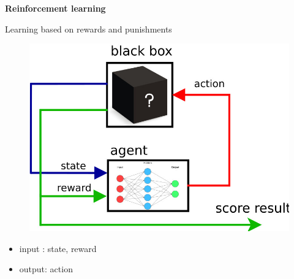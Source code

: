 \documentclass[xcolor=dvipsnames]{beamer}
\begin{document}
\begin{frame}{\bf Reinforcement learning}

Learning based on rewards and punishments

\begin{figure}[htbp]
  \centering
    \includegraphics[scale=0.27]{../diagrams/rl_mechanism.jpg}
\end{figure}

\begin {itemize}
  \item input : state, reward
  \item output: action
\end{itemize}

\end{frame}
\end{document}
